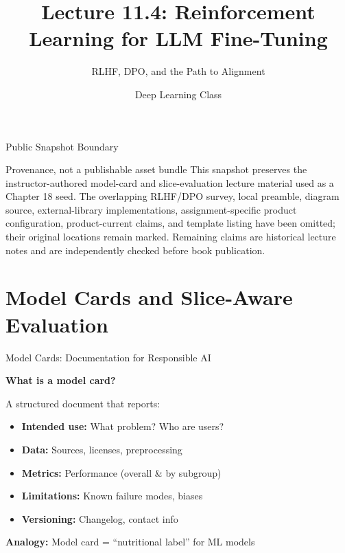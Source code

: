 \documentclass[xcolor=svgnames, 10pt, handout]{beamer}
\title{Lecture 11.4: Reinforcement Learning for LLM Fine-Tuning}
\subtitle{RLHF, DPO, and the Path to Alignment}
\author{Deep Learning Class}
\date{}
\begin{document}
\begin{frame}
\titlepage
\end{frame}

\begin{frame}{Public Snapshot Boundary}
\begin{alertblock}{Provenance, not a publishable asset bundle}
This snapshot preserves the instructor-authored model-card and slice-evaluation
lecture material used as a Chapter 18 seed. The overlapping RLHF/DPO survey, local
preamble, diagram source, external-library implementations, assignment-specific
product configuration, product-current claims, and template listing have been
omitted; their original locations remain marked. Remaining claims are historical
lecture notes and are independently checked before book publication.
\end{alertblock}
\end{frame}


\section{Model Cards and Slice-Aware Evaluation}

\begin{frame}{Model Cards: Documentation for Responsible AI}

\textbf{What is a model card?}

\pause

A structured document that reports:
\begin{itemize}
\item \textbf{Intended use:} What problem? Who are users?
\pause
\item \textbf{Data:} Sources, licenses, preprocessing
\pause
\item \textbf{Metrics:} Performance (overall \& by subgroup)
\pause
\item \textbf{Limitations:} Known failure modes, biases
\pause
\item \textbf{Versioning:} Changelog, contact info
\end{itemize}

\pause

\vspace{0.3cm}

\textbf{Analogy:} Model card = ``nutritional label'' for ML models

\end{frame}
\end{document}
